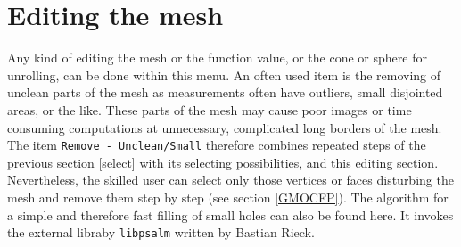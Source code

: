 \section{Editing the mesh}\label{edit} 
Any kind of editing the mesh or the function value, or the cone or sphere for unrolling, can be done within this menu. An often used item is the removing of unclean parts of the mesh as measurements often have outliers, small disjointed areas, or the like. These parts of the mesh may cause poor images or time consuming computations at unnecessary, complicated long borders of the mesh. The item {\tt Remove - Unclean/Small}
therefore combines repeated steps of the previous section \ref{select} with its selecting possibilities, and this editing section. Nevertheless, the skilled user can select only those vertices or faces disturbing the mesh and remove them step by step (see section \ref{GMOCFP}). The algorithm for a simple and therefore fast filling of small holes can also be found here. It invokes the external libraby {\tt libpsalm} written by Bastian Rieck.
